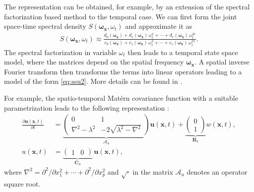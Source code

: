 \documentclass[journal]{IEEEtran}
\begin{document}
The representation can be obtained, for example, by an extension of the spectral factorization based method to the temporal case. We can first form the joint space-time spectral density $S(\boldsymbol{\omega}_{\mathbf{x}},\omega_t)$ and approximate it as
%
\begin{equation}
\begin{split}
  S(\boldsymbol{\omega}_{\mathbf{x}},\omega_t)
  \approx   \frac{d_0(\boldsymbol{\omega}_{\mathbf{x}})
  + d_1(\boldsymbol{\omega}_{\mathbf{x}}) \, \omega_t^2
  + \cdots + d_r(\boldsymbol{\omega}_{\mathbf{x}}) \, \omega_t^{2r}}
  {c_0(\boldsymbol{\omega}_{\mathbf{x}}) + c_1(\boldsymbol{\omega}_{\mathbf{x}}) \, \omega_t^2
  + \cdots + c_s(\boldsymbol{\omega}_{\mathbf{x}}) \, \omega_t^{2s}}.
\end{split}
\end{equation}
%
The spectral factorization in variable $\omega_t$ then leads to a temporal state space model, where the matrices depend on the spatial frequency $\boldsymbol{\omega}_{\mathbf{x}}$. A spatial inverse Fourier transform then transforms the terms into linear operators leading to a model of the form \eqref{eq:ssu2}. More details can be found in \cite{Sarkka+Solin+Hartikainen:2013}.

For example, the spatio-temporal Mat\'ern covariance function with a suitable parametrization leads to the following representation \cite{Sarkka+Solin+Hartikainen:2013}:
%
\begin{equation}
\begin{split}
  \frac{\partial \mathbf{u}(\mathbf{x},t)}{\partial t} &= 
       \underbrace{\begin{pmatrix} 
        0 & 1 \\ 
        \nabla^2-\lambda^2
        & -2 \sqrt{\lambda^2-\nabla^2} 
      \end{pmatrix}}_{\mathbf{\mathcal{A}}_u} \mathbf{u}(\mathbf{x},t)
      + \underbrace{\begin{pmatrix} 0 \\ 1 \end{pmatrix}}_{\mathbf{B}_u} w(\mathbf{x},t), \\
      u(\mathbf{x},t) &= \underbrace{\begin{pmatrix} 1 & 0 \end{pmatrix}}_{\mathbf{C}_u} \, \mathbf{u}(\mathbf{x},t),
\end{split}
\label{2dmatern_ss}
\end{equation}
%
where $\nabla^2 = \partial^2 / \partial x_1^2 + \cdots + \partial^2 / \partial x_p^2$ and $\sqrt{\cdot}$ in the matrix $\mathbf{\mathcal{A}}_u$ denotes an operator square root.
\end{document}
